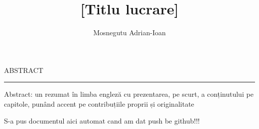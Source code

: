 \documentclass[12pt]{report}
\begin{document}
\title{[Titlu lucrare]}
\author{Mosnegutu Adrian-Ioan}

\maketitle

\newpage
\thispagestyle{empty}
\mbox{}
\newpage
{}

\cleardoublepage
ABSTRACT
\vspace{0.5cm}
\hrule
\vspace{0.5cm}

Abstract: un rezumat în limba engleză cu prezentarea, pe scurt, a conținutului pe
capitole, punând accent pe contribuțiile proprii și originalitate

S-a pus documentul aici automat cand am dat push be github!!!

\tableofcontents

\newpage
{}










\end{document}
